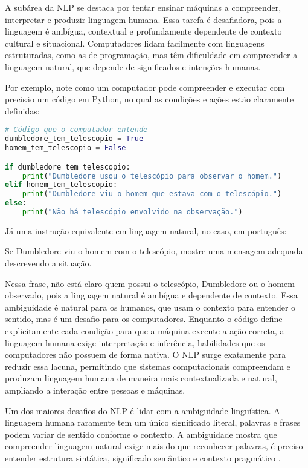 A subárea da NLP se destaca por tentar ensinar máquinas a compreender, interpretar e produzir linguagem humana. Essa tarefa é desafiadora, pois a linguagem é ambígua, contextual e profundamente dependente de contexto cultural e situacional. Computadores lidam facilmente com linguagens estruturadas, como as de programação, mas têm dificuldade em compreender a linguagem natural, que depende de significados e intenções humanas.

Por exemplo, note como um computador pode compreender e executar com precisão um código em Python, no qual as condições e ações estão claramente definidas:
\begin{lstlisting}[language=Python, style=input]
# Código que o computador entende
dumbledore_tem_telescopio = True
homem_tem_telescopio = False

if dumbledore_tem_telescopio:
    print("Dumbledore usou o telescópio para observar o homem.")
elif homem_tem_telescopio:
    print("Dumbledore viu o homem que estava com o telescópio.")
else:
    print("Não há telescópio envolvido na observação.")
\end{lstlisting}

\noindent Já uma instrução equivalente em linguagem natural, no caso, em português:
\begin{tcolorbox}[
  colback=yellow!20, 
  colframe=black,
  width=0.8\linewidth,   %
  left=0pt,               %
  boxsep=2mm,
  enlarge left by=0.1\linewidth  %
]
Se Dumbledore viu o homem com o telescópio, mostre uma mensagem adequada descrevendo a situação.
\end{tcolorbox}
Nessa frase, não está claro quem possui o telescópio, Dumbledore ou o homem observado, pois a linguagem natural é ambígua e dependente de contexto. Essa ambiguidade é natural para os humanos, que usam o contexto para entender o sentido, mas é um desafio para os computadores.
Enquanto o código define explicitamente cada condição para que a máquina execute a ação correta, a linguagem humana exige interpretação e inferência, habilidades que os computadores não possuem de forma nativa.
O NLP surge exatamente para reduzir essa lacuna, permitindo que sistemas computacionais compreendam e produzam linguagem humana de maneira mais contextualizada e natural, ampliando a interação entre pessoas e máquinas.

Um dos maiores desafios do NLP é lidar com a ambiguidade linguística. A linguagem humana raramente tem um único significado literal, palavras e frases podem variar de sentido conforme o contexto. A ambiguidade mostra que compreender linguagem natural exige mais do que reconhecer palavras, é preciso entender estrutura sintática, significado semântico e contexto pragmático \cite{jurafsky2023speech}.


